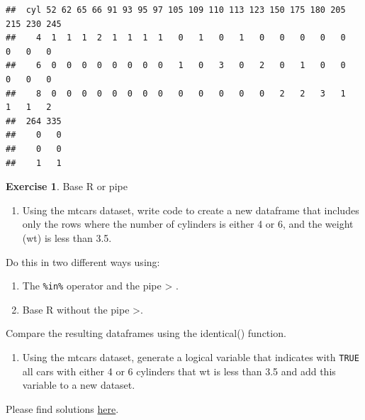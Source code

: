 \documentclass[
  12pt,
  oneside]{book}
\providecommand{\tightlist}{%
  \setlength{\itemsep}{0pt}\setlength{\parskip}{0pt}}
\theoremstyle{definition}
\theoremstyle{definition}
\theoremstyle{definition}
\newtheorem{exercise}{Exercise}[chapter]
\theoremstyle{definition}
\theoremstyle{remark}
\begin{document}
\begin{verbatim}
##  cyl 52 62 65 66 91 93 95 97 105 109 110 113 123 150 175 180 205 215 230 245
##    4  1  1  1  2  1  1  1  1   0   1   0   1   0   0   0   0   0   0   0   0
##    6  0  0  0  0  0  0  0  0   1   0   3   0   2   0   1   0   0   0   0   0
##    8  0  0  0  0  0  0  0  0   0   0   0   0   0   2   2   3   1   1   1   2
##  264 335
##    0   0
##    0   0
##    1   1
\end{verbatim}

\begin{exercise}
\protect\hypertarget{exr:baseorpipe}{}\label{exr:baseorpipe}Base R or pipe

\begin{enumerate}
\def\labelenumi{\alph{enumi})}
\tightlist
\item
  Using the mtcars dataset, write code to create a new dataframe that includes only the rows where the number of cylinders is either 4 or 6, and the weight (wt) is less than 3.5.
\end{enumerate}

Do this in two different ways using:

\begin{enumerate}
\def\labelenumi{\arabic{enumi}.}
\tightlist
\item
  The \texttt{\%in\%} operator and the pipe \textbar\textgreater{} .
\item
  Base R without the pipe \textbar\textgreater.
\end{enumerate}

Compare the resulting dataframes using the identical() function.

\begin{enumerate}
\def\labelenumi{\alph{enumi})}
\setcounter{enumi}{1}
\tightlist
\item
  Using the mtcars dataset, generate a logical variable that indicates with \texttt{TRUE} all cars with either 4 or 6 cylinders that wt is less than 3.5 and add this variable to a new dataset.
\end{enumerate}

Please find solutions \href{https://raw.githubusercontent.com/hubchev/courses/main/scr/exe_base_pipe.R}{here}.
\end{exercise}
\end{document}

